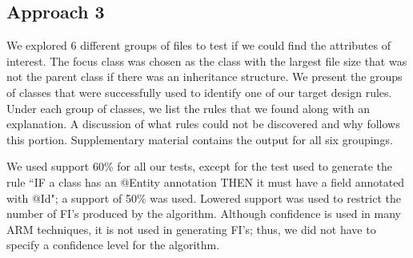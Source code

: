 \documentclass[12pt]{article}
\begin{document}
	\subsection{Approach 3}
	
	We explored 6 different groups of files to test if we could find the attributes of interest. The focus class was chosen as the class with the largest file size that was not the parent class if there was an inheritance structure. We present the groups of classes that were successfully used to identify one of our target design rules. Under each group of classes, we list the rules that we found along with an explanation. A discussion of what rules could not be discovered and why follows this portion. Supplementary material contains the output for all six groupings. 
	
	
	We used support 60\% for all our tests, except for the test used to generate the rule ``IF a class has an @Entity annotation THEN it must have a field annotated with @Id"; a support of 50\% was used. Lowered support was used to restrict the number of FI's produced by the algorithm. Although confidence is used in many ARM techniques, it is not used in generating FI's; thus, we did not have to specify a confidence level for the algorithm. 
	
	
\newcommand{\textcoloryellow}{\cellcolor{yellow}}  %
\end{document}
